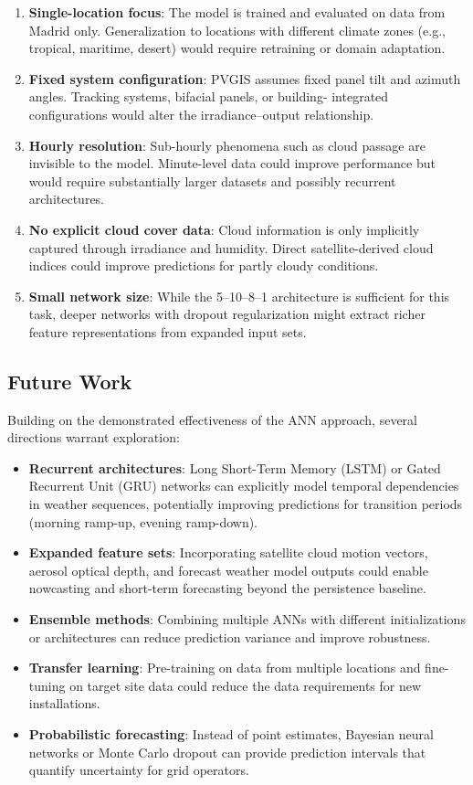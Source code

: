 \documentclass[11pt, a4paper]{article}
\begin{document}
\begin{enumerate}
    \item \textbf{Single-location focus}: The model is trained and evaluated on
data from Madrid only. Generalization to locations with different climate zones
(e.g., tropical, maritime, desert) would require retraining or domain adaptation.
    \item \textbf{Fixed system configuration}: PVGIS assumes fixed panel
tilt and azimuth angles. Tracking systems, bifacial panels, or building-
integrated configurations would alter the irradiance--output relationship.
    \item \textbf{Hourly resolution}: Sub-hourly phenomena such as cloud
passage are invisible to the model. Minute-level data could improve
performance but would require substantially larger datasets and possibly
recurrent architectures.
    \item \textbf{No explicit cloud cover data}: Cloud information is only
implicitly captured through irradiance and humidity. Direct satellite-derived
cloud indices could improve predictions for partly cloudy conditions.
    \item \textbf{Small network size}: While the 5--10--8--1 architecture is
sufficient for this task, deeper networks with dropout regularization might
extract richer feature representations from expanded input sets.
\end{enumerate}

\subsection{Future Work}

Building on the demonstrated effectiveness of the ANN approach, several
directions warrant exploration:

\begin{itemize}
    \item \textbf{Recurrent architectures}: Long Short-Term Memory (LSTM) or
Gated Recurrent Unit (GRU) networks can explicitly model temporal dependencies
in weather sequences, potentially improving predictions for transition periods
(morning ramp-up, evening ramp-down).
    \item \textbf{Expanded feature sets}: Incorporating satellite cloud motion
vectors, aerosol optical depth, and forecast weather model outputs could
enable nowcasting and short-term forecasting beyond the persistence baseline.
    \item \textbf{Ensemble methods}: Combining multiple ANNs with different
initializations or architectures can reduce prediction variance and improve
robustness.
    \item \textbf{Transfer learning}: Pre-training on data from multiple
locations and fine-tuning on target site data could reduce the data
requirements for new installations.
    \item \textbf{Probabilistic forecasting}: Instead of point estimates,
Bayesian neural networks or Monte Carlo dropout can provide prediction
intervals that quantify uncertainty for grid operators.
\end{itemize}
\end{document}
